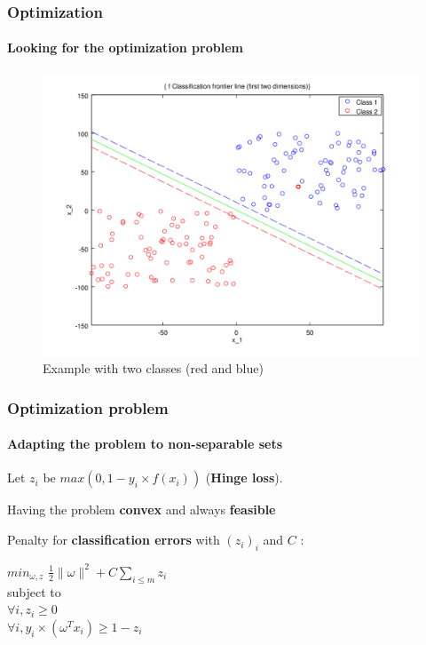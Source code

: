 \documentclass{beamer}
\begin{document}
\begin{frame}
\frametitle{Optimization}
\framesubtitle{Looking for the optimization problem}

         \begin{figure}
         \centering
         \caption{Example with two classes (red and blue)}
         \includegraphics[scale=0.4]{images/voronoi2.png}
         \end{figure}

\end{frame}

\begin{frame}
\frametitle{Optimization problem}
\framesubtitle{Adapting the problem to \textbf{non-separable sets}}

Let $z_i$ be $max(0, 1-y_i \times f(x_i))$ (\textbf{Hinge loss}).

\pause

\bigskip

\begin{block}{Having the problem \textbf{convex} and always \textbf{feasible}}

Penalty for \textbf{classification errors} with $(z_i)_i$ and $C$ :

           \begin{center}
           $min_{\omega, z}$ $\frac{1}{2} \|\omega\|^2 + C \sum_{i \leq m}z_i$\\
           subject to\\ $\forall i, z_i \geq 0$\\
           $\forall i, y_i \times (\omega^{T} x_i) \geq 1 - z_i$\\
           \end{center}

\end{block}

\end{frame}
\end{document}
